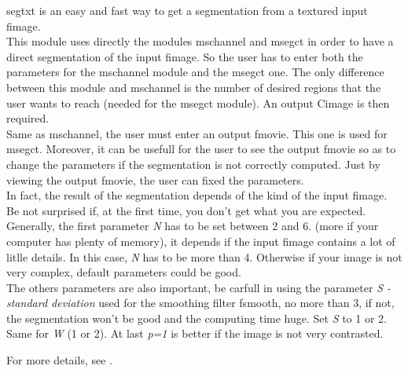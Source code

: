 {\sf segtxt} is an easy and fast 
way to get a segmentation from a textured input fimage.\\
This module uses directly the modules {\sf mschannel} and {\sf msegct} in order to have a direct segmentation 
of the input fimage. So the user has to enter both the parameters for the {\sf mschannel}
 module and the {\sf msegct} one. The only difference between 
 this module and {\sf mschannel} is the number of desired regions that the user wants to reach (needed for the {\sf msegct} 
 module). An output Cimage is then required.\\
 Same as {\sf mschannel}, the user must enter an output fmovie. This one is used for {\sf msegct}.
 Moreover, it can be usefull for the user to see the output fmovie so as to change the parameters
  if the segmentation is not correctly computed. Just by viewing the output fmovie, the user can fixed the parameters.\\
  In fact, the result of the segmentation depends of the kind of the input fimage. 
 Be not surprised if, at the first time, you don't get what you are expected. 
 Generally, the first parameter {\it N} has to be set between 2 and 6. (more if your computer has plenty of memory), it depends if the  input fimage contains a lot of litlle details. 
 In this case, {\it N} has to be more than 4. Otherwise if your image is not very complex, default parameters could be good.\\
 The others parameters are also important, be carfull in using the parameter {\it S - standard deviation} used for the smoothing filter {\sf fsmooth}, 
 no more than 3, if not, the segmentation won't be good and the computing time huge. Set 
 {\it S} to 1 or 2. Same for {\it W} (1 or 2). At last {\it p=1} is better if the image is not
 very contrasted.

\vskip 5mm

For more details, see \cite{koepfler.lopez.morel:segmentation}.

